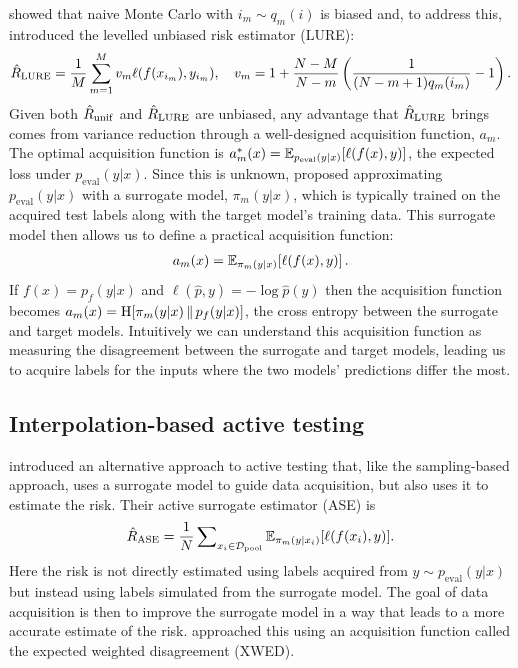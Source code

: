 \citet{farquhar2021statistical} showed that naive Monte Carlo with $i_m \sim q_m(i)$ is biased and, to address this, introduced the levelled unbiased risk estimator (LURE):
\begin{align}\label{eq:lure}
    \hat{R}_\mathrm{LURE} = \frac{1}{M} \sum_{m=1}^M v_m \ell(f(x_{i_m}), y_{i_m})
    , \quad v_m = 1 + \frac{N-M}{N-m} \left(\frac{1}{(N-m+1) q_m(i_m)} - 1\right)
    .
\end{align}
Given both $\hat{R}_\mathrm{unif}$ and $\hat{R}_\mathrm{LURE}$ are unbiased, any advantage that $\hat{R}_\mathrm{LURE}$ brings comes from variance reduction through a well-designed acquisition function, $a_m$.
The optimal acquisition function is $a^*_m(x) = \mathbb{E}_{p_\mathrm{eval}(y|x)} \! \left[ \ell(f(x), y) \right]$, the expected loss under $p_\mathrm{eval}(y|x)$.
Since this is unknown, \citet{kossen2021active} proposed approximating $p_\mathrm{eval}(y|x)$ with a surrogate model, $\pi_m(y|x)$, which is typically trained on the acquired test labels along with the target model's training data.
This surrogate model then allows us to define a practical acquisition function:
\begin{align}\label{eq:expected_loss_acq_fn}
    a_m(x) = \mathbb{E}_{\pi_m(y|x)} \! \left[ \ell(f(x), y) \right]
    .
\end{align}
If $f(x) = p_f(y|x)$ and $\ell(\hat{p}, y) = -\log \hat{p}(y)$ then the acquisition function becomes $a_m(x) = \mathrm{H} \! \left[ \pi_m(y|x) \, \| \, p_f(y|x) \right]$, the cross entropy between the surrogate and target models.
Intuitively we can understand this acquisition function as measuring the disagreement between the surrogate and target models, leading us to acquire labels for the inputs where the two models' predictions differ the most.





\subsection{Interpolation-based active testing}

\citet{kossen2022active} introduced an alternative approach to active testing that, like the sampling-based approach, uses a surrogate model to guide data acquisition, but also uses it to estimate the risk.
Their active surrogate estimator (ASE) is
\begin{align}\label{eq:ase}
    \hat{R}_\mathrm{ASE} = \frac{1}{N} \sum\nolimits_{x_i\in\mathcal{D}_\mathrm{pool}} \mathbb{E}_{\pi_m(y|x_i)}[\ell(f(x_i),y)]
    .
\end{align}
Here the risk is not directly estimated using labels acquired from $y \sim p_\mathrm{eval}(y|x)$ but instead using labels simulated from the surrogate model.
The goal of data acquisition is then to improve the surrogate model in a way that leads to a more accurate estimate of the risk.
\citet{kossen2022active} approached this using an acquisition function called the expected weighted disagreement (XWED).